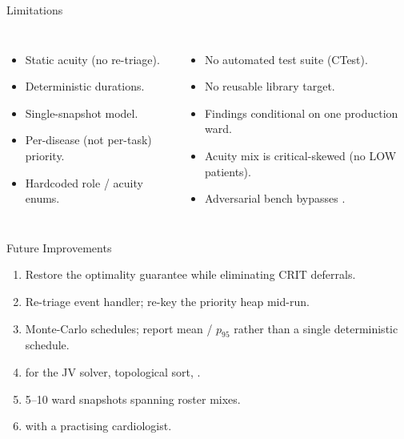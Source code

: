 \documentclass[aspectratio=169, 11pt]{beamer}
\begin{document}
\begin{frame}{Limitations}
  \begin{columns}[T,onlytextwidth]
      \begin{itemize}
        \item Static acuity (no re-triage).
        \item Deterministic durations.
        \item Single-snapshot model.
        \item Per-disease (not per-task) priority.
        \item Hardcoded role / acuity enums.
      \end{itemize}
      \begin{itemize}
        \item No automated test suite (CTest).
        \item No reusable library target.
        \item Findings conditional on one production ward.
        \item Acuity mix is critical-skewed (no LOW patients).
        \item Adversarial bench bypasses
              .
      \end{itemize}
  \end{columns}
\end{frame}

\begin{frame}{Future Improvements}
  \begin{enumerate}
    \item {} Restore the optimality
          guarantee while eliminating CRIT deferrals.
    \item {} Re-triage event handler;
          re-key the priority heap mid-run.
    \item {} Monte-Carlo schedules;
          report mean / $p_{95}$ rather than a single deterministic
          schedule.
    \item {} for the JV solver,
          topological sort, .
    \item {} 5--10 ward snapshots
          spanning roster mixes.
    \item {} with a practising cardiologist.
  \end{enumerate}
\end{frame}
\end{document}
